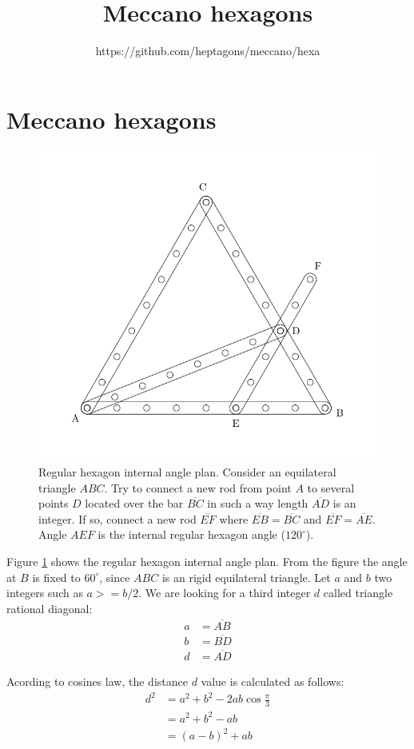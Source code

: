 \documentclass[11pt]{article}
\title{\textbf{Meccano hexagons}}
\author{https://github.com/heptagons/meccano/hexa}
\date{}
\begin{document}
\maketitle

\section{Meccano hexagons}

\begin{figure}[htpb]
\centering
\includegraphics[]{hexagon_angle}
\caption{Regular hexagon internal angle plan. Consider an equilateral triangle $ABC$.
Try to connect a new rod from point $A$ to several points $D$ located 
over the bar $\overline{BC}$
in such a way length $\overline{AD}$ is an integer.
If so, connect a new rod $\overline{EF}$ where $\overline{EB} = \overline{BC}$ and $\overline{EF} = \overline{AE}$. Angle $AEF$ is the internal regular hexagon angle ($120^\circ{}$).}
\label{fig:1}
\end{figure}

Figure \ref{fig:1} shows the regular hexagon internal angle plan.
From the figure the angle at $B$ is fixed to $60^\circ{}$, since $ABC$ is an
rigid equilateral triangle.
Let $a$ and $b$ two integers such as $a >= b/2$.
We are looking for a third integer $d$ called triangle rational diagonal:
\begin{align*}
a &= \overline{AB}\\
b &= \overline{BD}\\
d &= \overline{AD}
\end{align*}

Acording to cosines law, the distance $d$ value is calculated as follows:
\begin{align*}
d^2 &= a^2 + b^2 - 2ab\cos{\frac{\pi}{3}}\\
    &= a^2 + b^2 - ab\\
    &= (a-b)^2 + ab
\end{align*}
\end{document}
